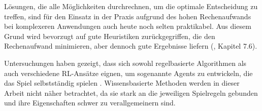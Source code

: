 Lösungen, die alle Möglichkeiten durchrechnen, um die optimale Entscheidung zu treffen, sind für den Einsatz in der Praxis aufgrund des hohen Rechenaufwands bei komplexeren Anwendungen auch heute noch selten praktikabel. Aus diesem Grund wird bevorzugt auf gute Heuristiken zurückgegriffen, die den Rechenaufwand minimieren, aber dennoch gute Ergebnisse liefern (\cite{Heineman.October2008}, Kapitel 7.6).

Untersuchungen haben gezeigt, dass sich sowohl regelbasierte Algorithmen als auch verschiedene RL-Ansätze eignen, um sogenannte Agents zu entwickeln, die das Spiel selbstständig spielen \cite{Alderton.2019}\cite{Thill.2012}\cite{Wäldchen.2022}\cite{Taylor.2024}\cite{Sheoran.2022}\cite{Qiu.2022}. Wissensbasierte Methoden werden in dieser Arbeit nicht näher betrachtet, da sie stark an die jeweiligen Spielregeln gebunden und ihre Eigenschaften schwer zu verallgemeinern sind.
